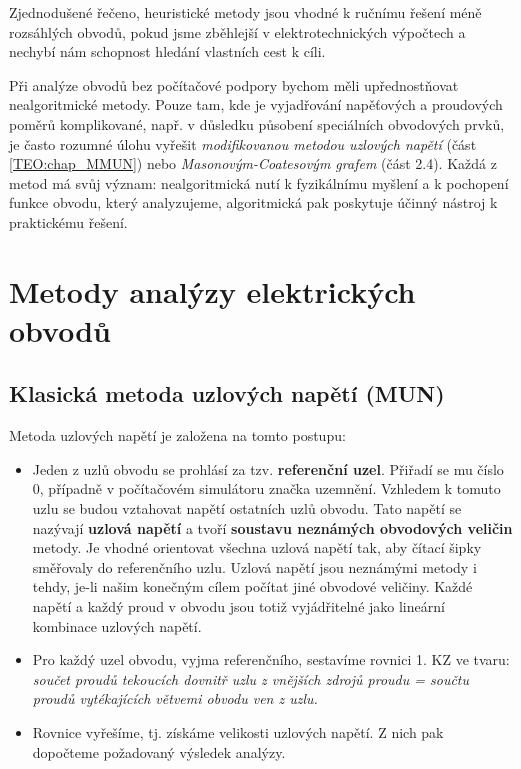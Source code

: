 {      Zjednodušené řečeno, heuristické metody jsou vhodné k ručnímu řešení méně rozsáhlých obvodů, 
      pokud jsme zběhlejší v elektrotechnických výpočtech a nechybí nám schopnost hledání vlastních 
      cest k cíli.
      
      Při analýze obvodů bez počítačové podpory bychom měli upřednostňovat nealgoritmické metody. 
      Pouze tam, kde je vyjadřování napěťových a proudových poměrů komplikované, např. v důsledku 
      působení speciálních obvodových prvků, je často rozumné úlohu vyřešit \emph{modifikovanou 
      metodou uzlových napětí} (část \ref{TEO:chap_MMUN}) nebo \emph{Masonovým-Coatesovým grafem} 
      (část 2.4). Každá z metod má svůj význam: nealgoritmická nutí k fyzikálnímu myšlení a k 
      pochopení funkce obvodu, který analyzujeme, algoritmická pak poskytuje účinný nástroj k 
      praktickému řešení.

  \section{Metody analýzy elektrických ob\-vo\-dů}
    \subsection{Klasická metoda uzlových napětí (MUN)}
      Metoda uzlových napětí je založena na tomto postupu:
      \begin{itemize}
       \item Jeden z uzlů obvodu se prohlásí za tzv. \textbf{referenční uzel}. Přiřadí se mu 
             číslo 0, případně v počítačovém simulátoru značka uzemnění. Vzhledem k tomuto uzlu se 
             budou vztahovat napětí ostatních uzlů obvodu. Tato napětí se nazývají \textbf{uzlová 
             napětí} a tvoří \textbf{soustavu neznámých obvodových veličin} metody. Je vhodné 
             orientovat všechna uzlová napětí tak, aby čítací šipky směřovaly do referenčního uzlu. 
             Uzlová napětí jsou neznámými metody i tehdy, je-li našim konečným cílem počítat 
             jiné obvodové veličiny. Každé napětí a každý proud v obvodu jsou totiž vyjádřitelné 
             jako lineární kombinace uzlových napětí.
       \item Pro každý uzel obvodu, vyjma referenčního, sestavíme rovnici 1. KZ ve tvaru:
             \emph{součet proudů tekoucích dovnitř uzlu z vnějších zdrojů proudu  = součtu proudů
             vytékajících větvemi obvodu ven z uzlu.}
       \item Rovnice vyřešíme, tj. získáme velikosti uzlových napětí. Z nich pak dopočteme  
             požadovaný výsledek analýzy.
      \end{itemize}
      
}
